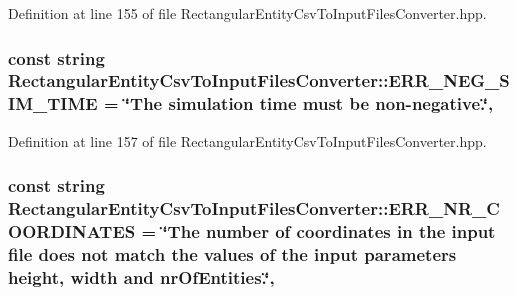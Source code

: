 Definition at line 155 of file Rectangular\-Entity\-Csv\-To\-Input\-Files\-Converter.\-hpp.

\hypertarget{classmultiscale_1_1video_1_1RectangularEntityCsvToInputFilesConverter_a54116309bc8f25763b6b8bd7c6b5963a}{
\subsubsection[{E\-R\-R\-\_\-\-N\-E\-G\-\_\-\-S\-I\-M\-\_\-\-T\-I\-M\-E}]{\setlength{\rightskip}{0pt plus 5cm}const string Rectangular\-Entity\-Csv\-To\-Input\-Files\-Converter\-::\-E\-R\-R\-\_\-\-N\-E\-G\-\_\-\-S\-I\-M\-\_\-\-T\-I\-M\-E = \char`\"{}The simulation time must be non-\/negative.\char`\"{}\hspace{0.3cm}{\ttfamily [static]}, {\ttfamily [private]}}}\label{classmultiscale_1_1video_1_1RectangularEntityCsvToInputFilesConverter_a54116309bc8f25763b6b8bd7c6b5963a}


Definition at line 157 of file Rectangular\-Entity\-Csv\-To\-Input\-Files\-Converter.\-hpp.

\hypertarget{classmultiscale_1_1video_1_1RectangularEntityCsvToInputFilesConverter_ac290c5c37c0be34a4091f441c4fa67ec}{
\subsubsection[{E\-R\-R\-\_\-\-N\-R\-\_\-\-C\-O\-O\-R\-D\-I\-N\-A\-T\-E\-S}]{\setlength{\rightskip}{0pt plus 5cm}const string Rectangular\-Entity\-Csv\-To\-Input\-Files\-Converter\-::\-E\-R\-R\-\_\-\-N\-R\-\_\-\-C\-O\-O\-R\-D\-I\-N\-A\-T\-E\-S = \char`\"{}The number of coordinates in the input file does not match the values of the input parameters {\bf height}, {\bf width} and nr\-Of\-Entities.\char`\"{}\hspace{0.3cm}{\ttfamily [static]}, {\ttfamily [private]}}}\label{classmultiscale_1_1video_1_1RectangularEntityCsvToInputFilesConverter_ac290c5c37c0be34a4091f441c4fa67ec}


